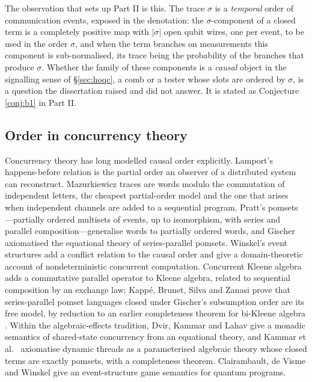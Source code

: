 The observation that sets up Part II is this. The trace $\sigma$ is a \emph{temporal} order of communication events, exposed in the denotation: the $\sigma$-component of a closed term is a completely positive map with $|\sigma|$ open qubit wires, one per event, to be used in the order $\sigma$, and when the term branches on measurements this component is sub-normalised, its trace being the probability of the branches that produce $\sigma$. Whether the family of these components is a \emph{causal} object in the signalling sense of \S\ref{sec:hoqc}, a comb or a tester whose slots are ordered by $\sigma$, is a question the dissertation raised and did not answer. It is stated as Conjecture \ref{conj:b1} in Part II.

\subsection{Order in concurrency theory}\label{sec:concurrency}

Concurrency theory has long modelled causal order explicitly. Lamport's happens-before relation \cite{lamport1978time} is the partial order an observer of a distributed system can reconstruct. Mazurkiewicz traces \cite{diekert1995traces} are words modulo the commutation of independent letters, the cheapest partial-order model and the one that arises when independent channels are added to a sequential program. Pratt's pomsets \cite{pratt1986pomsets}---partially ordered multisets of events, up to isomorphism, with series and parallel composition---generalise words to partially ordered words, and Gischer \cite{gischer1988pomsets} axiomatised the equational theory of series-parallel pomsets. Winskel's event structures \cite{winskel1986eventstructures,nielsen1981petri,winskel1995models} add a conflict relation to the causal order and give a domain-theoretic account of nondeterministic concurrent computation. Concurrent Kleene algebra \cite{hoare2011cka} adds a commutative parallel operator to Kleene algebra, related to sequential composition by an exchange law; Kappé, Brunet, Silva and Zanasi \cite{kappe2018cka} prove that series-parallel pomset languages closed under Gischer's subsumption order are its free model, by reduction to an earlier completeness theorem for bi-Kleene algebra \cite{laurence2014completeness}. Within the algebraic-effects tradition, Dvir, Kammar and Lahav \cite{dvir2022sharedstate} give a monadic semantics of shared-state concurrency from an equational theory, and Kammar et al.\ \cite{kammar2026threads} axiomatise dynamic threads as a parameterised algebraic theory whose closed terms are exactly pomsets, with a completeness theorem. Clairambault, de Visme and Winskel \cite{clairambault2019quantumgames} give an event-structure game semantics for quantum programs.

